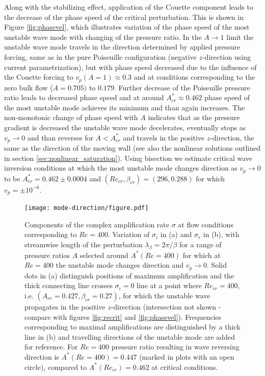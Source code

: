 \documentclass[lineno]{jfm}
\begin{document}
Along with the stabilizing effect, application of the Couette component leads to the decrease of the phase speed of the critical perturbation. This is shown in Figure \ref{fig:phasevel}, which illustrates variation of the phase speed of the most unstable wave mode with changing of the pressure ratio.
In the $A\to1$ limit the unstable wave mode travels in the direction determined by applied pressure forcing, same as in the pure Poiseuille configuration (negative $z$-direction using current parametrization),
but with phase speed decreased due to the influence of the Couette forcing to $v_p(A=1)\approx0.3$ and at conditions corresponding to the zero bulk flow ($A=0.705)$ to $0.179$.
Further decrease of the Poiseuille pressure ratio leads to decreased phase speed and at around
$A^{*}_{cr}\approx0.462$ phase speed of the most unstable mode achieves its minimum and than again increases.
The non-monotonic change of phase speed with $A$ indicates that as the pressure gradient is decreased the unstable wave mode decelerates, eventually stops as $v_p\to0$ and than reverses for $A<A^{*}_{cr}$ and travels in the positive $z$-direction, the same as the direction of the moving wall (see also the nonlinear solutions outlined in section \ref{sec:nonlinear_saturation}).
Using bisection we estimate critical wave inversion conditions at which the most unstable mode changes direction as $v_p\to0$
to be $A^{*}_{cr}= 0.462\pm 0.0004$ and $(Re_{cr}, \beta_{cr})=(296, 0.288)$ for which $v_p=\pm10^{-6}$.

\begin{figure}
\centering
	\texttt{[image: mode-direction/figure.pdf]}  
	\caption{Components of the complex amplification rate $\sigma$ at flow conditions corresponding to $Re=400$.
	Variation of $\sigma_i$ in (a) and $\sigma_r$ in (b), with streamwise length of the perturbation $\lambda_\beta=2\pi/\beta$ for a range of pressure ratios $A$ selected around $A^*(Re=400)$ for which at $Re=400$ the unstable mode changes direction and $v_p\to0$.
    Solid dots in (a) distinguish positions of maximum amplification and the thick connecting line crosses $\sigma_i=0$ line at a point where $Re_{cr}=400$, i.e. $(A_{cr}=0.427, \beta_{cr}=0.27)$, for which the unstable wave propagates in the positive $z$-direction (intersection not shown - compare with figures \ref{fig:recrit} and \ref{fig:phasevel}). Frequencies corresponding to maximal amplifications are distinguished by a thick line in (b) and travelling directions of the unstable mode are added for reference.
    For $Re=400$ pressure ratio resulting in wave reversing direction is $A^*(Re=400)=0.447$ (marked in plots with an open circle), compared to $A^*(Re_{cr})=0.462$ at critical conditions.}
	\label{fig:re400}
\end{figure}
\end{document}
